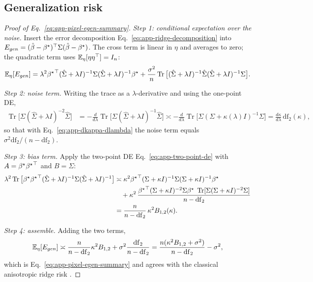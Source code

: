 \subsection{Generalization risk}

\begin{proof}[Proof of Eq.~\ref{eq:app-pixel-egen-summary}]
\emph{Step 1: conditional expectation over the noise.}  Insert the error
decomposition Eq.~\ref{eq:app-ridge-decomposition} into
$E_{gen}=(\hat{\beta}-{\beta^{\star}})^\top\Sigma(\hat{\beta}-{\beta^{\star}})$.  The cross term is linear
in $\eta$ and averages to zero; the quadratic term uses
$\mathbb{E}_\eta[\eta\eta^\top]=I_n$:
\begin{equation}
\mathbb{E}_\eta[E_{gen}]
=\lambda^2{{\beta^{\star}}}^\top(\hat\Sigma+\lambda I)^{-1}\Sigma(\hat\Sigma+\lambda I)^{-1}{\beta^{\star}}
+\frac{\sigma^2}{n}\operatorname{Tr}\big[(\hat\Sigma+\lambda I)^{-1}\hat\Sigma(\hat\Sigma+\lambda I)^{-1}\Sigma\big].
\label{eq:app-egen-conditional}
\end{equation}

\emph{Step 2: noise term.}  Writing the trace as a $\lambda$-derivative and
using the one-point DE,
\begin{align*}
\operatorname{Tr}\big[\Sigma(\hat\Sigma+\lambda I)^{-2}\hat\Sigma\big]
&=-\frac{d}{d\lambda}\operatorname{Tr}\big[\Sigma(\hat\Sigma+\lambda I)^{-1}\hat\Sigma\big]
\asymp-\frac{d}{d\lambda}\operatorname{Tr}\big[\Sigma(\Sigma+\kappa(\lambda)I)^{-1}\Sigma\big]
=\frac{d\kappa}{d\lambda}\,\mathrm{df}_2(\kappa),
\end{align*}
so that with Eq.~\ref{eq:app-dkappa-dlambda} the noise term equals
$\sigma^2\mathrm{df}_2/(n-\mathrm{df}_2)$.

\emph{Step 3: bias term.}  Apply the two-point DE
Eq.~\ref{eq:app-two-point-de} with $A={\beta^{\star}}{{\beta^{\star}}}^\top$ and $B=\Sigma$:
\begin{align*}
\lambda^2\operatorname{Tr}\big[{\beta^{\star}}{{\beta^{\star}}}^\top(\hat\Sigma+\lambda I)^{-1}\Sigma(\hat\Sigma+\lambda I)^{-1}\big]
&\asymp\kappa^2{{\beta^{\star}}}^\top(\Sigma+\kappa I)^{-1}\Sigma(\Sigma+\kappa I)^{-1}{\beta^{\star}}
\\&\quad+\kappa^2\,\frac{{{\beta^{\star}}}^\top(\Sigma+\kappa I)^{-2}\Sigma{\beta^{\star}}\;\operatorname{Tr}[\Sigma(\Sigma+\kappa I)^{-2}\Sigma]}{n-\mathrm{df}_2}\\
&=\frac{n}{n-\mathrm{df}_2}\,\kappa^2B_{1,2}(\kappa).
\end{align*}

\emph{Step 4: assemble.}  Adding the two terms,
\begin{equation}
\mathbb{E}_\eta[E_{gen}]\asymp\frac{n}{n-\mathrm{df}_2}\kappa^2B_{1,2}+\sigma^2\frac{\mathrm{df}_2}{n-\mathrm{df}_2}
=\frac{n(\kappa^2B_{1,2}+\sigma^2)}{n-\mathrm{df}_2}-\sigma^2 ,
\label{eq:generalization_error_classic}
\end{equation}
which is Eq.~\ref{eq:app-pixel-egen-summary} and agrees with the classical
anisotropic ridge risk \citep{dobriban2018high,hastie2022surprises}.
\end{proof}

